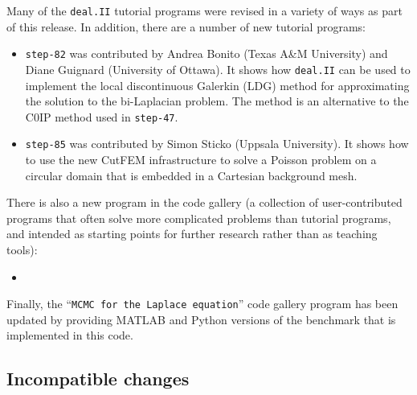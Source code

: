 \documentclass{ansarticle-preprint}
\newcommand{\specialword}[1]{\texttt{#1}}
\newcommand{\dealii}{{\specialword{deal.II}}\xspace}
\begin{document}
Many of the \dealii{} tutorial programs were revised in a variety of
ways as part of this release. In addition, there are a number of new tutorial programs:
\begin{itemize}
\item \texttt{step-82} was contributed by Andrea Bonito (Texas A\&M University) and Diane Guignard (University of Ottawa). It shows how
\dealii{} can be used to implement the
local discontinuous Galerkin (LDG) method for approximating the
solution to the bi-Laplacian problem. The method is an alternative to
the C0IP method used in \texttt{step-47}.

\item \texttt{step-85} was contributed by Simon Sticko (Uppsala University). It shows how to use the new CutFEM infrastructure to solve a Poisson
problem on a circular domain that is embedded in a Cartesian background mesh.
\end{itemize}

There is also a new program in the code gallery (a collection of
user-contributed programs that often solve more complicated problems
than tutorial programs, and intended as starting points for further
research rather than as teaching tools):
\begin{itemize}
  \item {}
\end{itemize}
Finally, the ``\texttt{MCMC for the Laplace equation}'' code gallery
program has been updated by providing MATLAB and Python versions of
the benchmark that is implemented in this code.



\subsection{Incompatible changes}\label{subsec:deprecated}
\end{document}

